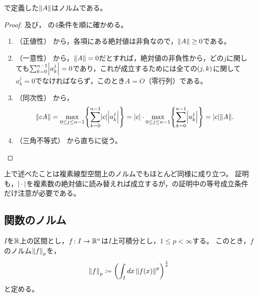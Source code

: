 \documentclass[b5paper,draft]{ltjsbook}
\begin{document}
\begin{prop}
    で定義した$\norm{A}$はノルムである。
    \begin{proof}
        及び，
        の4条件を順に確かめる。
        \begin{enumerate}[label=(\roman*)]
            \item （正値性）
            から，各項にある絶対値は非負なので，$\norm{A} \geq 0$である。

            \item （一意性）
            から，$\norm{A}=0$だとすれば，絶対値の非負性から，どの$j$に関しても$\sum_{k=0}^{n-1}\abs{a^j_k}=0$であり，これが成立するためには全ての$\pare{j,k}$に関して$a^j_k=0$でなければならず，このとき$A=O$（零行列）である。

            \item （同次性）
            から，
            \begin{equation}
                \norm{cA}=\max_{0\leq j\leq n-1} \bra{\sum_{k=0}^{n-1} \abs{c}\abs{a^j_k}}=\abs{c}\cdot \max_{0\leq j\leq n-1} \bra{\sum_{k=0}^{n-1} \abs{a^j_k}}=\abs{c}\norm{A}.
            \end{equation}

            \item （三角不等式）
            から直ちに従う。
        \end{enumerate}
    \end{proof}
\end{prop}

\begin{rem}
    上で述べたことは複素線型空間上のノルムでもほとんど同様に成り立つ。
    証明も，$\abs{\dummy}$を複素数の絶対値に読み替えれば成立するが，の証明中の等号成立条件だけ注意が必要である。
\end{rem}


\subsection{関数のノルム}
\begin{defi}[$L^p$ノルム]
    $I$を$\mathbb{R}$上の区間とし，$f\colon I\to \mathbb{R}^n$は$I$上可積分とし，$1\leq p <\infty$する。
    このとき，$f$のノルム$\norm{f}_p$を，
    \begin{equation}
        \norm{f}_p \coloneqq \pare{\int_I dx\, \norm{\fun{f}{x}}^p}^{\frac{1}{p}}
    \end{equation}
    と定める。
\end{defi}
\end{document}
